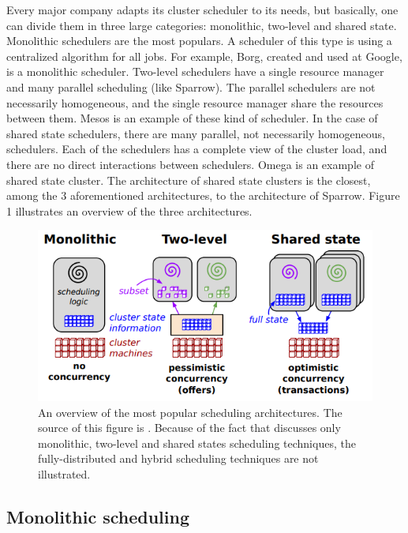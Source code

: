 \documentclass[11pt]{article}
\begin{document}
	Every major company adapts its cluster scheduler to its needs, but basically, one can divide them in three large categories: monolithic, two-level and shared state. Monolithic schedulers are the most populars. A scheduler of this type is using a centralized algorithm for all jobs. For example, Borg, created and used at Google, is a monolithic scheduler. Two-level schedulers have a single resource manager and many parallel scheduling (like Sparrow). The parallel schedulers are not necessarily homogeneous, and the single resource manager share the resources between them. Mesos \cite{mesos} is an example of these kind of scheduler. In the case of shared state schedulers, there are many parallel, not necessarily homogeneous, schedulers. Each of the schedulers has a complete view of the cluster load, and there are no direct interactions between schedulers. Omega \cite{omega} is an example of shared state cluster. The architecture of shared state clusters is the closest, among the 3 aforementioned architectures, to the architecture of Sparrow. Figure 1 illustrates an overview of the three architectures.
    
    \begin{figure}
    	\includegraphics[scale=.6]{architectures}
        \caption{An overview of the most popular scheduling architectures. The source of this figure is \cite{omega}. Because of the fact that \cite{omega} discusses only monolithic, two-level and shared states scheduling techniques, the fully-distributed and hybrid scheduling techniques are not illustrated.}
    \end{figure}

	\subsection{Monolithic scheduling}
    
\end{document}
